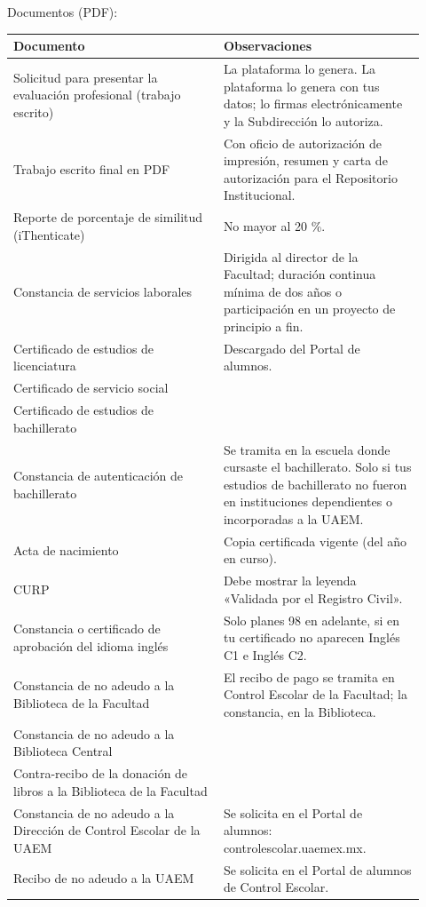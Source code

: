 Documentos (PDF):
{\small\begin{longtable}{>{\raggedright\arraybackslash}p{0.47\linewidth}>{\raggedright\arraybackslash}p{0.45\linewidth}}
\toprule
\textbf{Documento} & \textbf{Observaciones}\\
\midrule
\endhead
Solicitud para presentar la evaluación profesional (trabajo escrito) & La plataforma lo genera. La plataforma lo genera con tus datos; lo firmas electrónicamente y la Subdirección lo autoriza.\\
Trabajo escrito final en PDF & Con oficio de autorización de impresión, resumen y carta de autorización para el Repositorio Institucional.\\
Reporte de porcentaje de similitud (iThenticate) & No mayor al 20 \%.\\
Constancia de servicios laborales & Dirigida al director de la Facultad; duración continua mínima de dos años o participación en un proyecto de principio a fin.\\
Certificado de estudios de licenciatura & Descargado del Portal de alumnos.\\
Certificado de servicio social & \\
Certificado de estudios de bachillerato & \\
Constancia de autenticación de bachillerato & Se tramita en la escuela donde cursaste el bachillerato. Solo si tus estudios de bachillerato no fueron en instituciones dependientes o incorporadas a la UAEM.\\
Acta de nacimiento & Copia certificada vigente (del año en curso).\\
CURP & Debe mostrar la leyenda «Validada por el Registro Civil».\\
Constancia o certificado de aprobación del idioma inglés & Solo planes 98 en adelante, si en tu certificado no aparecen Inglés C1 e Inglés C2.\\
Constancia de no adeudo a la Biblioteca de la Facultad & El recibo de pago se tramita en Control Escolar de la Facultad; la constancia, en la Biblioteca.\\
Constancia de no adeudo a la Biblioteca Central & \\
Contra-recibo de la donación de libros a la Biblioteca de la Facultad & \\
Constancia de no adeudo a la Dirección de Control Escolar de la UAEM & Se solicita en el Portal de alumnos: controlescolar.uaemex.mx.\\
Recibo de no adeudo a la UAEM & Se solicita en el Portal de alumnos de Control Escolar.\\

\end{longtable}}
